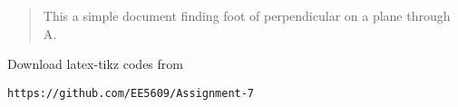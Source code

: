 \documentclass[journal,12pt,twocolumn]{IEEEtran}
\begin{document}
% 
\maketitle
\newpage
\bigskip
\renewcommand{\thefigure}{\theenumi}
\renewcommand{\thetable}{\theenumi}
%
%
\begin{abstract}
This a simple document finding foot of perpendicular on a plane through A.
\end{abstract}
Download latex-tikz codes from 
%
\begin{lstlisting}
https://github.com/EE5609/Assignment-7
\end{lstlisting}
%
\end{document}
